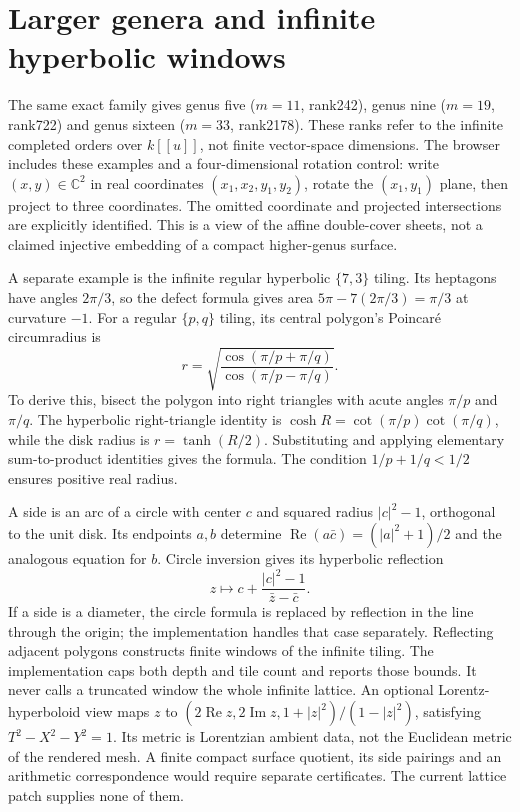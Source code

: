 \documentclass[11pt,oneside,openany]{book}
\theoremstyle{definition}\newtheorem{definition}[theorem]{Definition}
\theoremstyle{remark}\newtheorem{remark}[theorem]{Remark}
\newcommand{\C}{\mathbb C}\newcommand{\Z}{\mathbb Z}\newcommand{\R}{\mathbb R}
\begin{document}
\section{Larger genera and infinite hyperbolic windows}
The same exact family gives genus five ($m=11$, rank242), genus nine ($m=19$, rank722) and genus sixteen ($m=33$, rank2178). These ranks refer to the infinite completed orders over $k[[u]]$, not finite vector-space dimensions. The browser includes these examples and a four-dimensional rotation control: write $(x,y)\in\C^2$ in real coordinates $(x_1,x_2,y_1,y_2)$, rotate the $(x_1,y_1)$ plane, then project to three coordinates. The omitted coordinate and projected intersections are explicitly identified. This is a view of the affine double-cover sheets, not a claimed injective embedding of a compact higher-genus surface.

A separate example is the infinite regular hyperbolic $\{7,3\}$ tiling. Its heptagons have angles $2\pi/3$, so the defect formula gives area $5\pi-7(2\pi/3)=\pi/3$ at curvature $-1$. For a regular $\{p,q\}$ tiling, its central polygon's Poincar\'e circumradius is
\[
 r=\sqrt{\frac{\cos(\pi/p+\pi/q)}{\cos(\pi/p-\pi/q)}}.
\]
To derive this, bisect the polygon into right triangles with acute angles $\pi/p$ and $\pi/q$. The hyperbolic right-triangle identity is $\cosh R=\cot(\pi/p)\cot(\pi/q)$, while the disk radius is $r=\tanh(R/2)$. Substituting and applying elementary sum-to-product identities gives the formula. The condition $1/p+1/q<1/2$ ensures positive real radius.

A side is an arc of a circle with center $c$ and squared radius $|c|^2-1$, orthogonal to the unit disk. Its endpoints $a,b$ determine $\operatorname{Re}(a\bar c)=(|a|^2+1)/2$ and the analogous equation for $b$. Circle inversion gives its hyperbolic reflection
\[
 z\longmapsto c+\frac{|c|^2-1}{\bar z-\bar c}.
\]
If a side is a diameter, the circle formula is replaced by reflection in the line through the origin; the implementation handles that case separately. Reflecting adjacent polygons constructs finite windows of the infinite tiling. The implementation caps both depth and tile count and reports those bounds. It never calls a truncated window the whole infinite lattice. An optional Lorentz-hyperboloid view maps $z$ to $(2\operatorname{Re}z,2\operatorname{Im}z,1+|z|^2)/(1-|z|^2)$, satisfying $T^2-X^2-Y^2=1$. Its metric is Lorentzian ambient data, not the Euclidean metric of the rendered mesh. A finite compact surface quotient, its side pairings and an arithmetic correspondence would require separate certificates. The current lattice patch supplies none of them.
\end{document}
